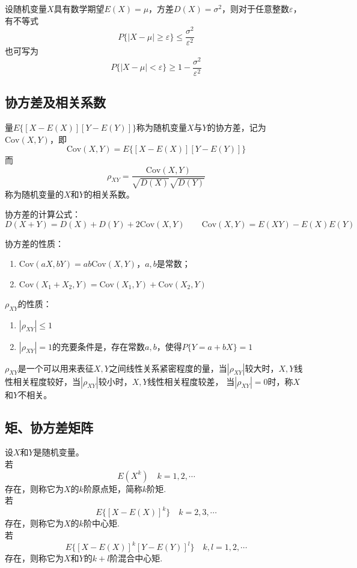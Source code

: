 \begin{theorem}
    设随机变量$X$具有数学期望$E(X)=\mu$，方差$D(X)=\sigma^2$，则对于任意整数$\varepsilon$，有不等式
    $$P\{|X-\mu|\geq \varepsilon\}\leq \frac{\sigma^2}{\varepsilon^2}$$
    也可写为$$P\{|X-\mu|<\varepsilon\}\geq 1- \frac{\sigma^2}{\varepsilon^2}$$
\end{theorem}

\subsection{协方差及相关系数}
\begin{definition}
    量$E\{[X-E(X)][Y-E(Y)]\}$称为随机变量$X$与$Y$的{\heiti 协方差}，记为$\mathrm{Cov}(X,Y)$，即
    $$\mathrm{Cov}(X,Y)=E\{[X-E(X)][Y-E(Y)]\}$$
    而$$\rho _{XY}=\frac{\mathrm{Cov}(X,Y)}{\sqrt{D(X)}\sqrt{D(Y)}}$$
    称为随机变量的$X$和$Y$的{\heiti 相关系数}。

    协方差的计算公式：
    $$D(X+Y)=D(X)+D(Y)+2\mathrm{Cov}(X,Y) \qquad \mathrm{Cov}(X,Y)=E(XY)-E(X)E(Y)$$
\end{definition}

\begin{theorem}
    协方差的性质：
    \begin{enumerate}
        \item $\mathrm{Cov}(aX,bY)=ab\mathrm{Cov}(X,Y)$，$a,b$是常数；
        \item $\mathrm{Cov}(X_1+X_2,Y)=\mathrm{Cov}(X_1,Y)+\mathrm{Cov}(X_2,Y)$
    \end{enumerate}
\end{theorem}

\begin{theorem}
    $\rho_{XY}$的性质：
    \begin{enumerate}
        \item $|\rho_{XY}|\leq 1$
        \item $|\rho_{XY}|= 1$的充要条件是，存在常数$a,b$，使得$P\{Y=a+bX\}=1$
    \end{enumerate}

    $\rho_{XY}$是一个可以用来表征$X,Y$之间线性关系紧密程度的量，当$|\rho_{XY}|$较大时，$X,Y$线性相关程度较好，当$|\rho_{XY}|$较小时，$X,Y$线性相关程度较差，
    当$|\rho_{XY}|=0$时，称$X$和$Y$不相关。    
\end{theorem}

\subsection{矩、协方差矩阵}
\begin{definition}
    设$X$和$Y$是随机变量。\\若
    $$E(X^k) \quad k=1,2,\cdots$$
    存在，则称它为$X$的{\heiti $k$阶原点矩}，简称{\heiti $k$阶矩}.
    \\若$$E\{[X-E(X)]^k\} \quad k=2,3,\cdots$$
    存在，则称它为$X$的{\heiti $k$阶中心矩}.
    \\若$$E\{[X-E(X)]^k[Y-E(Y)]^l\} \quad k,l=1,2,\cdots$$
    存在，则称它为$X$和$Y$的{\heiti $k+l$阶混合中心矩}.
\end{definition}

